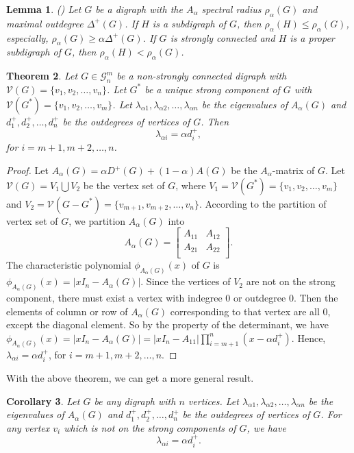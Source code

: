 \documentclass[11pt]{article}
\newtheorem{theorem}{Theorem}[section]
\newtheorem{lemma}[theorem]{Lemma}
\newtheorem{corollary}[theorem]{Corollary}
\begin{document}
\noindent\begin{lemma}\label{le:ch-2.4}(\cite{LiWC})  Let $G$ be a digraph with the $A_\alpha$ spectral radius $\rho_\alpha(G)$ and maximal outdegree $\Delta^+(G)$. If $H$ is a subdigraph of $G$, then $\rho_\alpha(H)\leq\rho_\alpha(G)$, especially, $\rho_\alpha(G)\geq\alpha\Delta^+(G)$. If $G$ is strongly connected and $H$ is a proper subdigraph of $G$, then $\rho_\alpha(H)<\rho_\alpha(G)$.
\end{lemma}

\noindent\begin{theorem}\label{th:ch-2.5}  Let $G\in\mathcal{G}_n^m$ be a non-strongly connected digraph with $\mathcal{V}(G)=\{v_1,v_2,\ldots,v_n\}$. Let $G^*$ be a unique strong component of $G$ with $\mathcal{V}(G^*)=\{v_1,v_2,\ldots,v_m\}$. Let $\lambda_{\alpha1}, \lambda_{\alpha2}, \ldots, \lambda_{\alpha n}$ be the eigenvalues of $A_\alpha(G)$ and $d_1^+, d_2^+, \ldots, d_n^+$ be the outdegrees of vertices of $G$. Then
$$\lambda_{\alpha i}=\alpha d_i^+,$$
for $i=m+1,m+2,\ldots,n$.
\end{theorem}
\begin{proof}
Let $A_\alpha(G)=\alpha D^+(G)+(1-\alpha)A(G)$ be the $A_\alpha$-matrix of $G$. Let $\mathcal{V}(G)=V_1\bigcup V_2$ be the vertex set of $G$, where $V_1=\mathcal{V}(G^*)=\{v_1,v_2,\ldots,v_m\}$ and $V_2=\mathcal{V}(G-G^*)=\{v_{m+1},v_{m+2},\ldots,v_n\}$. According to the partition of vertex set of $G$, we partition $A_\alpha(G)$ into
$$
A_\alpha(G)=\left[
  \begin{array}{c|c}
   A_{11} & A_{12}\\ \hline
   A_{21} & A_{22}\\
  \end{array}
\right].
$$
The characteristic polynomial $\phi_{A_\alpha(G)}(x)$ of $G$ is $\phi_{A_\alpha(G)}(x)=|xI_n-A_\alpha(G)|$. Since the vertices of $V_2$ are not on the strong component, there must exist a vertex with indegree $0$ or outdegree $0$. Then the elements of column or row of $A_\alpha(G)$ corresponding to that vertex are all $0$, except the diagonal element. So by the property of the determinant, we have $\phi_{A_\alpha(G)}(x)=|xI_n-A_\alpha(G)|=|xI_n-A_{11}|\prod_{i=m+1}^n (x-\alpha d_i^+)$. Hence, $\lambda_{\alpha i}=\alpha d_i^+$, for $i=m+1,m+2,\ldots,n$.
\end{proof}

With the above theorem, we can get a more general result.

\noindent\begin{corollary}\label{co:ch-2.6}
Let $G$ be any digraph with $n$ vertices. Let $\lambda_{\alpha1}, \lambda_{\alpha2}, \ldots, \lambda_{\alpha n}$ be the eigenvalues of $A_\alpha(G)$ and $d_1^+, d_2^+, \ldots, d_n^+$ be the outdegrees of vertices of $G$. For any vertex $v_i$ which is not on the strong components of $G$, we have
$$\lambda_{\alpha i}=\alpha d_i^+.$$
\end{corollary}
\end{document}
